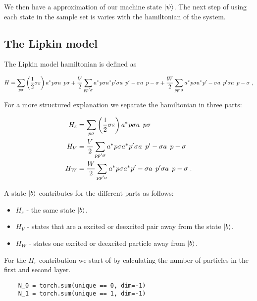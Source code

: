 We then have a approximation of our machine state $\ket{\psi}$. The next step of using each state in the sample set is varies with the hamiltonian of the system.

\subsection{The Lipkin model}

The Lipkin model hamiltonian is defined as

\begin{equation} 
    H = \sum_{p\sigma} \left ( \frac{1}{2} \sigma \varepsilon \right ) \hc{a}{p\sigma}\op{a}{p\sigma} + \frac{V}{2}\sum_{pp'\sigma} \hc{a}{p\sigma} \hc{a}{p'\sigma} \op{a}{p'-\sigma}\op{a}{p-\sigma} + \frac{W}{2} \sum_{pp'\sigma} \hc{a}{p\sigma} \hc{a}{p'-\sigma} \op{a}{p'\sigma}\op{a}{p-\sigma} \; , 
\end{equation}

For a more structured explanation we separate the hamiltonian in three parts:

\begin{align}
  H_{\varepsilon} &= \sum_{p\sigma} \left ( \frac{1}{2} \sigma \varepsilon \right ) \hc{a}{p\sigma}\op{a}{p\sigma}\\ 
  H_V &= \frac{V}{2}\sum_{pp'\sigma} \hc{a}{p\sigma} \hc{a}{p'\sigma} \op{a}{p'-\sigma}\op{a}{p-\sigma}\\
  H_W &= \frac{W}{2} \sum_{pp'\sigma} \hc{a}{p\sigma} \hc{a}{p'-\sigma} \op{a}{p'\sigma}\op{a}{p-\sigma}  \; .
  \label{eq:LMG_split_H}
\end{align}

 A state $\ket{b}$ contributes for the different parts as follows:

\begin{itemize}
  \item $H_{\varepsilon}$ - the same state $\ket{b}$.
  \item $H_V$ - states that are a excited or deexcited pair away from the state $\ket{b}$.
  \item $H_W$ - states one excited or deexcited particle away from $\ket{b}$.
\end{itemize}

For the $H_{\varepsilon}$ contribution we start of by calculating the number of particles in the first and second layer.

\begin{verbatim}
    N_0 = torch.sum(unique == 0, dim=-1)
    N_1 = torch.sum(unique == 1, dim=-1)
\end{verbatim}

